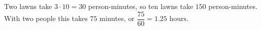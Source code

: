 Two lawns take $3\cdot10=30$ person-minutes, so ten lawns take $150$ person-minutes. With two people this takes $75$ minutes, or $\dfrac{75}{60}=\boxed{1.25\text{ hours}}$.
